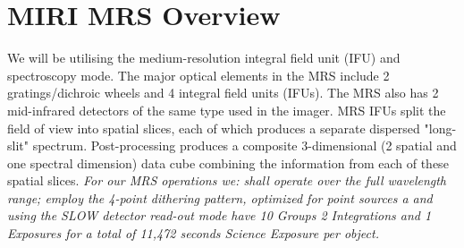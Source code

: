 \section*{MIRI MRS Overview}
We will be utilising the medium-resolution integral field unit (IFU) and spectroscopy mode.  
The major optical elements in the MRS include 2 gratings/dichroic
wheels and 4 integral field units (IFUs). The MRS also has 2
mid-infrared detectors of the same type used in the imager.  MRS IFUs
split the field of view into spatial slices, each of which produces a
separate dispersed "long-slit" spectrum. Post-processing produces a
composite 3-dimensional (2 spatial and one spectral dimension) data
cube combining the information from each of these spatial slices.  
{\it For our MRS operations we: shall operate over the full wavelength range; 
employ the 4-point dithering pattern, optimized for point sources a
and using the SLOW  detector read-out mode have 
10 Groups
2 Integrations and 
1 Exposures for a total 
of 11,472 seconds Science Exposure per object.}


